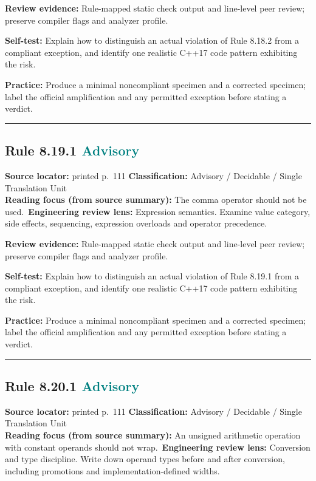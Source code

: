 \documentclass[10pt,letterpaper]{article}
\begin{document}
\textbf{Review evidence:} Rule-mapped static check output and line-level peer review; preserve compiler flags and analyzer profile.

\textbf{Self-test:} Explain how to distinguish an actual violation of Rule 8.18.2 from a compliant exception, and identify one realistic C++17 code pattern exhibiting the risk.\par
\textbf{Practice:} Produce a minimal noncompliant specimen and a corrected specimen; label the official amplification and any permitted exception before stating a verdict.
\smallskip\hrule\smallskip
\subsection*{Rule 8.19.1 \enspace \texorpdfstring{\small\textcolor{teal}{Advisory}}{Advisory}}
\noindent\textbf{Source locator:} printed p.~111 \quad\textbf{Classification:} Advisory / Decidable / Single Translation Unit\\
\textbf{Reading focus (from source summary):} The comma operator should not be used.\
\textbf{Engineering review lens:} Expression semantics. Examine value category, side effects, sequencing, expression overloads and operator precedence.

\textbf{Review evidence:} Rule-mapped static check output and line-level peer review; preserve compiler flags and analyzer profile.

\textbf{Self-test:} Explain how to distinguish an actual violation of Rule 8.19.1 from a compliant exception, and identify one realistic C++17 code pattern exhibiting the risk.\par
\textbf{Practice:} Produce a minimal noncompliant specimen and a corrected specimen; label the official amplification and any permitted exception before stating a verdict.
\smallskip\hrule\smallskip
\subsection*{Rule 8.20.1 \enspace \texorpdfstring{\small\textcolor{teal}{Advisory}}{Advisory}}
\noindent\textbf{Source locator:} printed p.~111 \quad\textbf{Classification:} Advisory / Decidable / Single Translation Unit\\
\textbf{Reading focus (from source summary):} An unsigned arithmetic operation with constant operands should not wrap.\
\textbf{Engineering review lens:} Conversion and type discipline. Write down operand types before and after conversion, including promotions and implementation-defined widths.
\end{document}
